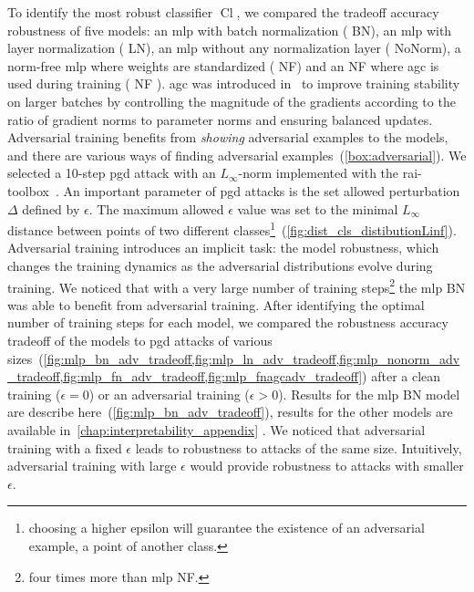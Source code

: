\documentclass[../main.tex]{subfiles}
\begin{document}
		To identify the most robust classifier \(\operatorname{Cl}\), we compared the tradeoff accuracy robustness of five models: an \gls{mlp} with batch normalization ( BN), an \gls{mlp} with layer normalization ( LN), an \gls{mlp} without any normalization layer ( NoNorm), a norm-free \gls{mlp} where weights are standardized ( NF) and an  NF where \gls{agc} is used during training ( NF ).
		\Gls{agc} was introduced in~\cite{NoNormApplied} to improve training stability on larger batches by controlling the magnitude of the gradients according to the ratio of gradient norms to parameter norms and ensuring balanced updates.
		Adversarial training benefits from \emph{showing} adversarial examples to the models, and there are various ways of finding adversarial examples~(\cref{box:adversarial}).
		We selected a 10-step \gls{pgd} attack with an \(L_{\infty}\)-norm implemented with the {\sourcecode rai-toolbox}~\cite{soklaski2022toolspracticesresponsibleai}.
		An important parameter of \gls{pgd} attacks is the set allowed perturbation \(\Delta\) defined by \(\epsilon\).
		The maximum allowed \(\epsilon\) value was set to the minimal \(L_{\infty}\) distance between points of two different classes\footnote{choosing a higher epsilon will guarantee the existence of an adversarial example, \ie{} a point of another class.}~(\cref{fig:dist_cls_distibutionLinf}).
		Adversarial training introduces an implicit task: the model robustness, which changes the training dynamics as the adversarial distributions evolve during training.
		We noticed that with a very large number of training steps\footnote{four times more than \gls{mlp} NF.} the \gls{mlp} BN was able to benefit from adversarial training.
		After identifying the optimal number of training steps for each model, we compared the robustness accuracy tradeoff of the models to \gls{pgd} attacks of various sizes~(\cref{fig:mlp_bn_adv_tradeoff,fig:mlp_ln_adv_tradeoff,fig:mlp_nonorm_adv_tradeoff,fig:mlp_fn_adv_tradeoff,fig:mlp_fnagcadv_tradeoff}) after a clean training (\(\epsilon = 0\)) or an adversarial training (\(\epsilon > 0\)).
		Results for the \gls{mlp} BN model are describe here~(\cref{fig:mlp_bn_adv_tradeoff}), results for the other models  are available in~\cref{chap:interpretability_appendix} .
		We noticed that adversarial training with a fixed \(\epsilon\) leads to robustness to attacks of the same size.
		Intuitively, adversarial training with large \(\epsilon\) would provide robustness to attacks with smaller \(\epsilon\).
\end{document}
